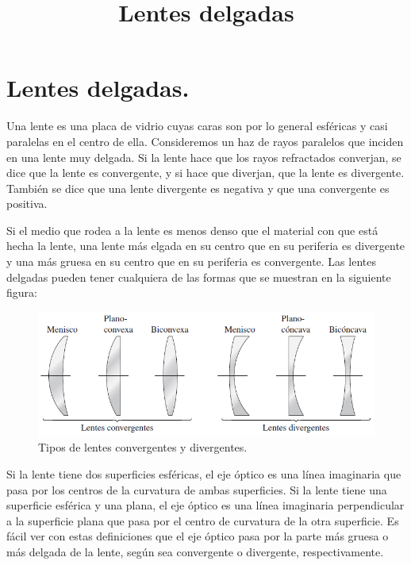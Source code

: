 \documentclass[14pt]{extarticle}
\title{\vspace*{-2cm} Lentes delgadas}
\date{ }
\begin{document}
\maketitle

\section{Lentes delgadas.}

Una lente es una placa de vidrio cuyas caras son por lo general esféricas y casi paralelas en el centro de ella. Consideremos un haz de rayos paralelos que inciden en una lente muy delgada. Si la lente hace que los rayos refractados converjan, se dice que la lente es convergente, y si hace que diverjan, que la lente es divergente. También se dice que una lente divergente es negativa y que una convergente es positiva.

Si el medio que rodea a la lente es menos denso que el material con que está hecha la lente, una lente más elgada en su centro que en su periferia es divergente y una más gruesa en su centro que en su periferia es convergente. Las lentes delgadas pueden tener cualquiera de las formas que se muestran en la siguiente figura:
\begin{figure}[H]
    \centering
    \includegraphics[scale=0.75]{Imagenes/Lentes_01.png}
    \caption{Tipos de lentes convergentes y divergentes.}
\end{figure}
Si la lente tiene dos superficies esféricas, el eje óptico es una línea imaginaria que pasa por los centros de la curvatura de ambas superficies. Si la lente tiene una superficie esférica y una plana, el eje óptico es una línea imaginaria perpendicular a la superficie plana que pasa por el centro de curvatura de la otra superficie. Es fácil ver con estas definiciones que el eje óptico pasa por la parte más gruesa o más delgada de la lente, según sea convergente o divergente, respectivamente.
\end{document}
